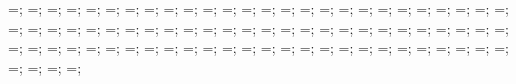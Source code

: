 {{\translayerlinet=\translayerlinet;
\ssinterlinet=\ssinterlinet;
\markssexspace=\markssexspace;
\markssrad=\markssrad;
\marksslinet=\marksslinet;
\supershadespace=\supershadespace;
\shearwalllinet=\shearwalllinet;
\marksuperexspace=\marksuperexspace;
\marksuperrad=\marksuperrad;
\marksuperlinet=\marksuperlinet;
\phorspringspace=\phorspringspace;
\phortextshiftx=\phortextshiftx;
\phortextshifty=\phortextshifty;
\phorsegm=\phorsegm;
\phorsprwid=\phorsprwid;
\phorsprlinethk=\phorsprlinethk;
\phorsuppwidth=\phorsuppwidth;
\phorsuppdepth=\phorsuppdepth;
\phorsupplinethk=\phorsupplinethk;
\pverspringspace=\pverspringspace;
\pverspbtwspr=\pverspbtwspr;
\pvertextshiftx=\pvertextshiftx;
\pvertextshifty=\pvertextshifty;
\pverampl=\pverampl;
\pversegm=\pversegm;
\pverspringthk=\pverspringthk;
\pversuppwidth=\pversuppwidth;
\pversuppdepth=\pversuppdepth;
\pversupplinethk=\pversupplinethk;
\pvertextshiftx=\pvertextshiftx;
\pvertextshifty=\pvertextshifty;
\paxialspringlength=\paxialspringlength;
\paxialspringsegm=\paxialspringsegm;
\paxialspringwidth=\paxialspringwidth;
\paxialspringlinethk=\paxialspringlinethk;
\paxialsuppwidth=\paxialsuppwidth;
\paxialsuppdepth=\paxialsuppdepth;
\paxialsupplinethk=\paxialsupplinethk;
\leftwspringspace=\leftwspringspace;
\leftwtextshiftx=\leftwtextshiftx;
\leftwtextshifty=\leftwtextshifty;
\leftwspringlength=\leftwspringlength;
\leftwampl=\leftwampl;
\leftwsegm=\leftwsegm;
\leftwspringthk=\leftwspringthk;
\leftwsuppwidth=\leftwsuppwidth;
\leftwsuppdepth=\leftwsuppdepth;
\leftwsupplinethk=\leftwsupplinethk;
\rightwspringspace=\rightwspringspace;
\rightwtextshiftx=\rightwtextshiftx;
\rightwtextshifty=\rightwtextshifty;
\rightwspringlength=\rightwspringlength;
\rightwampl=\rightwampl;
\rightwsegm=\rightwsegm;
\rightwspringthk=\rightwspringthk;
\rightwsuppwidth=\rightwsuppwidth;
\rightwsuppdepth=\rightwsuppdepth;
\rightwsupplinethk=\rightwsupplinethk;
\foundspringspace=\foundspringspace;
\foundtextshiftx=\foundtextshiftx;
\foundtextshifty=\foundtextshifty;
\foundspringlength=\foundspringlength;
\foundampl=\foundampl;
\foundsegm=\foundsegm;
\foundspringthk=\foundspringthk;
\foundsuppwidth=\foundsuppwidth;
\foundsuppdepth=\foundsuppdepth;
\foundsupplinethk=\foundsupplinethk;
\lefttriw=\lefttriw;
\leftlinew=\leftlinew;
\leftlined=\leftlined;
\leftlinet=\leftlinet;
\leftxvalue=\leftxvalue;
\leftyvalue=\leftyvalue;
\righttriw=\righttriw;
\rightlinew=\rightlinew;
\rightlined=\rightlined;
\rightlinet=\rightlinet;
\rightxvalue=\rightxvalue;
\rightyvalue=\rightyvalue;
\bottomtriw=\bottomtriw;
\bottomlinew=\bottomlinew;
}}
